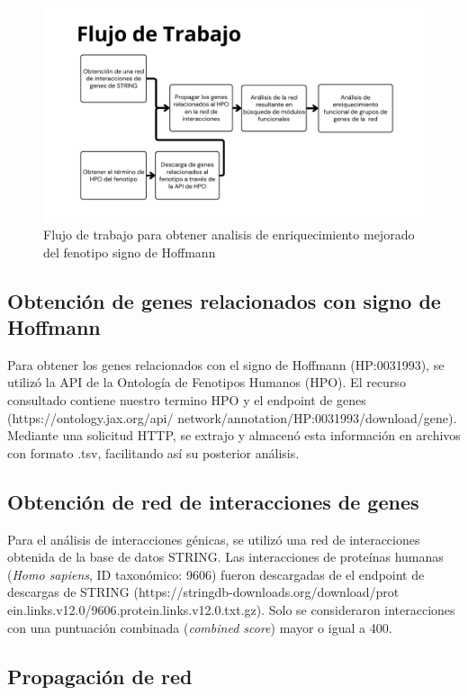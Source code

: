\begin{figure}[h!]
	\includegraphics[width=.95\textwidth]{figures/workflow.png}
	\caption{Flujo de trabajo para obtener analisis de enriquecimiento mejorado del fenotipo signo de Hoffmann}
	\label{fig:workflow}
\end{figure}

\subsection{Obtención de genes relacionados con signo de Hoffmann}

Para obtener los genes relacionados con el signo de Hoffmann (HP:0031993), se utilizó la API de la Ontología de Fenotipos Humanos (HPO). El recurso consultado contiene nuestro termino HPO y el endpoint de genes (https://ontology.jax.org/api/
network/annotation/HP:0031993/download/gene). Mediante una solicitud HTTP, se extrajo y almacenó esta información en archivos con formato .tsv, facilitando así su posterior análisis. 


\subsection{Obtención de red de interacciones de genes}

Para el análisis de interacciones génicas, se utilizó una red de interacciones obtenida de la base de datos STRING. Las interacciones de proteínas humanas (\textit{Homo sapiens}, ID taxonómico: 9606) fueron descargadas de el endpoint de descargas de STRING (https://stringdb-downloads.org/download/prot ein.links.v12.0/9606.protein.links.v12.0.txt.gz). Solo se consideraron interacciones con una puntuación combinada (\textit{combined score}) mayor o igual a 400.

\newpage

\subsection{Propagación de red}


